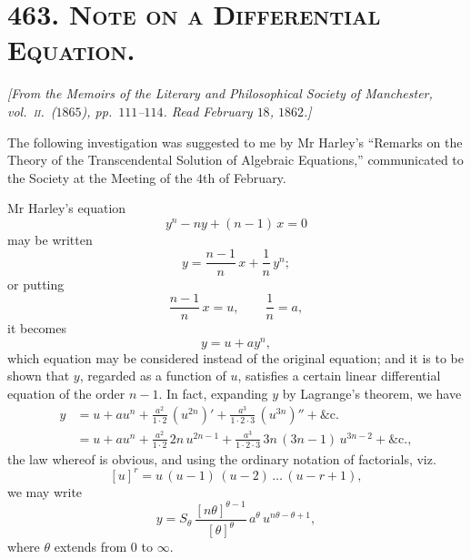 \documentclass[11pt]{article}
\begin{document}
\section*{463. \textsc{Note on a Differential Equation.}}

\begin{center}
\textit{[From the Memoirs of the Literary and Philosophical Society of
Manchester, vol.\ \textsc{ii}.\ ($1865$), pp.\ $111$--$114$. Read
February $18$, $1862$.]}
\end{center}

\medskip

The following investigation was suggested to me by Mr Harley's
``Remarks on the Theory of the Transcendental Solution of Algebraic
Equations,'' communicated to the Society at the Meeting of the $4$th
of February.

Mr Harley's equation
\[
y^{n} - ny + (n-1)\, x = 0
\]
may be written
\[
y = \frac{n-1}{n}\, x + \frac{1}{n}\, y^{n};
\]
or putting
\[
\frac{n-1}{n}\, x = u, \qquad \frac{1}{n} = a,
\]
it becomes
\[
y = u + a y^{n},
\]
which equation may be considered instead of the original equation; and
it is to be shown that $y$, regarded as a function of $u$, satisfies a
certain linear differential equation of the order $n-1$. In fact,
expanding $y$ by Lagrange's theorem, we have
\begin{align*}
y &= u + a u^{n} + \frac{a^{2}}{1\cdot 2}\, (u^{2n})'
   + \frac{a^{3}}{1\cdot 2\cdot 3}\, (u^{3n})'' + \&\mathrm{c}.\\[2pt]
  &= u + a u^{n} + \frac{a^{2}}{1\cdot 2}\, 2n\, u^{2n-1}
   + \frac{a^{3}}{1\cdot 2\cdot 3}\, 3n\,(3n-1)\, u^{3n-2} + \&\mathrm{c}.,
\end{align*}
the law whereof is obvious, and using the ordinary notation of
factorials, viz.
\[
[u]^{r} = u\,(u-1)\,(u-2)\,\ldots\,(u-r+1),
\]
we may write
\[
y = S_{\theta}\, \frac{[n\theta]^{\theta-1}}{[\theta]^{\theta}}\, a^{\theta}\, u^{n\theta-\theta+1},
\]
where $\theta$ extends from $0$ to $\infty$.
\end{document}
